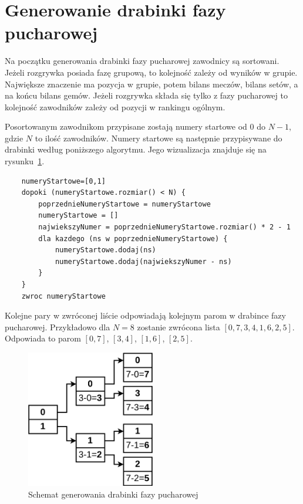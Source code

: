 \documentclass[shortabstract]{iithesis}
\begin{document}
\section{Generowanie drabinki fazy pucharowej}
Na początku generowania drabinki fazy pucharowej zawodnicy są sortowani. Jeżeli rozgrywka posiada fazę grupową, to kolejność zależy od wyników w grupie.
Największe znaczenie ma pozycja w grupie, potem bilans meczów, bilans setów, a na końcu bilans gemów.
Jeżeli rozgrywka składa się tylko z fazy pucharowej to kolejność zawodników zależy od pozycji w rankingu ogólnym.

Posortowanym zawodnikom przypisane zostają numery startowe od $0$ do $N-1$, gdzie $N$ to ilość zawodników.
Numery startowe są następnie przypisywane do drabinki według poniższego algorytmu. Jego wizualizacja znajduje się na rysunku~\ref{fig:knockout_bracket_generation}.
\begin{lstlisting}
    numeryStartowe=[0,1]
    dopoki (numeryStartowe.rozmiar() < N) {
        poprzednieNumeryStartowe = numeryStartowe
        numeryStartowe = []
        najwiekszyNumer = poprzednieNumeryStartowe.rozmiar() * 2 - 1
        dla kazdego (ns w poprzednieNumeryStartowe) {
            numeryStartowe.dodaj(ns)
            numeryStartowe.dodaj(najwiekszyNumer - ns)
        }
    }
    zwroc numeryStartowe
\end{lstlisting}
Kolejne pary w zwróconej liście odpowiadają kolejnym parom w drabince fazy pucharowej.
Przykładowo dla $N=8$ zostanie zwrócona lista $[0, 7, 3, 4, 1, 6, 2, 5]$. Odpowiada to parom
$[0, 7]$, $[3, 4]$, $[1, 6]$, $[2, 5]$.
\begin{figure}[H]
    \centering
    \includegraphics[width=0.5\textwidth]{assets/generowanie_drabinki.png}
    \caption{Schemat generowania drabinki fazy pucharowej}
    \label{fig:knockout_bracket_generation}
\end{figure}
\end{document}
